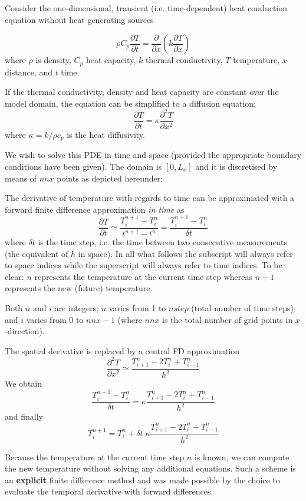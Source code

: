 Consider the one-dimensional, transient (i.e. time-dependent) 
heat conduction equation without heat generating sources

\[
\rho C_p \frac{\partial T}{\partial t} 
= \frac{\partial }{\partial x} \left(  k  \frac{\partial T}{\partial x} \right)
\]
where $\rho$ is density, $C_p$ heat capacity, $k$ thermal conductivity, $T$ temperature, 
$x$ distance, and $t$ time. 

If the thermal conductivity, density and heat capacity are constant over the model domain, 
the equation can be simplified to a diffusion equation:
\[
\frac{\partial T}{\partial t} =  \kappa \frac{\partial^2 T}{\partial x^2} 
\]
where $\kappa=k/\rho c_p$ is the heat diffusivity. 

We wish to solve this PDE in time and space (provided the appropriate 
boundary conditions have been given). The domain is $[0,L_x]$
and it is discretised by means of $nnx$ points as depicted hereunder:

\begin{center}

\end{center}

The derivative of temperature with regards to time can be approximated
with a forward finite difference approximation {\it in time} as
\[
\frac{\partial T}{\partial t} 
\simeq \frac{T_{i}^{n+1}-T_i^n}{t^{n+1}-t^n} 
= \frac{T_{i}^{n+1}-T_i^n}{\delta t} 
\]
where $\delta t$ is the time step, i.e. the time between two consecutive 
measurements (the equivalent of $h$ in space). 
In all what follows the subscript will always refer to space indices 
while the superscript will always refer to time indices.
To be clear: $n$ represents the temperature at the current time step whereas $n+1$
represents the new (future) temperature. %

Both $n$ and $i$ are integers; $n$ varies from 1 to $nstep$ (total number of time steps)
and $i$ varies from 0 to $nnx-1$ (where $nnx$ is the total number of grid points in $x$-direction).

The spatial derivative is replaced by a central FD approximation
\[
\frac{\partial^2 T}{\partial x^2} 
\simeq \frac{T_{i+1}^n - 2T_i^n + T_{i-1}^n}{h^2}
\]
We obtain
\[
\frac{T_{i}^{n+1}-T_i^n}{\delta t} 
= \kappa \frac{T_{i+1}^n - 2T_i^n + T_{i-1}^n}{h^2}
\]
and finally
\[
\boxed{
T_i^{n+1}=T_i^n + \delta t \; \kappa \frac{T_{i+1}^n - 2T_i^n + T_{i-1}^n}{h^2}
}
\]

Because the temperature at the current time step $n$ is known,
we can compute the new temperature without solving any additional equations.
Such a scheme is an {\bf explicit} finite difference method and
was made possible by the choice to evaluate the temporal derivative with forward differences.

